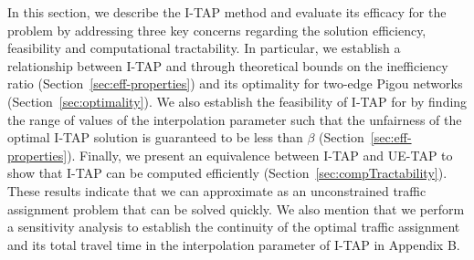 \documentclass{article}
\newif\ifarxiv   %
\begin{document}

In this section, we describe the I-TAP method and evaluate its efficacy for the \fso problem by addressing three key concerns regarding the solution efficiency, feasibility and computational tractability. In particular, we establish a relationship between I-TAP and \fso through theoretical bounds on the inefficiency ratio (Section~\ref{sec:eff-properties}) and its optimality for two-edge Pigou networks (Section~\ref{sec:optimality}). We also establish the feasibility of I-TAP for \fso by finding the range of values of the interpolation parameter such that the unfairness of the optimal I-TAP solution is guaranteed to be less than $\beta$ (Section~\ref{sec:eff-properties}). Finally, we present an equivalence between I-TAP and UE-TAP to show that I-TAP can be computed efficiently (Section~\ref{sec:compTractability}). These results indicate that we can approximate \fso as an unconstrained traffic assignment problem that can be solved quickly. We also mention that we perform a sensitivity analysis to establish the continuity of the optimal traffic assignment and its total travel time in the interpolation parameter of I-TAP in \ifarxiv Section~\ref{sec:solution-properties}\else Appendix B\fi.


\end{document}
